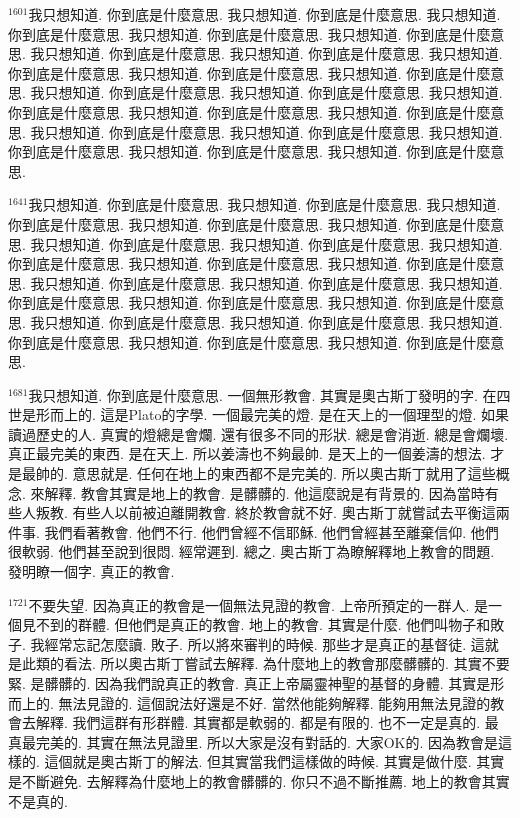 \documentclass{book}
\begin{document}
$^{1601}$我只想知道.
你到底是什麼意思.
我只想知道.
你到底是什麼意思.
我只想知道.
你到底是什麼意思.
我只想知道.
你到底是什麼意思.
我只想知道.
你到底是什麼意思.
我只想知道.
你到底是什麼意思.
我只想知道.
你到底是什麼意思.
我只想知道.
你到底是什麼意思.
我只想知道.
你到底是什麼意思.
我只想知道.
你到底是什麼意思.
我只想知道.
你到底是什麼意思.
我只想知道.
你到底是什麼意思.
我只想知道.
你到底是什麼意思.
我只想知道.
你到底是什麼意思.
我只想知道.
你到底是什麼意思.
我只想知道.
你到底是什麼意思.
我只想知道.
你到底是什麼意思.
我只想知道.
你到底是什麼意思.
我只想知道.
你到底是什麼意思.
我只想知道.
你到底是什麼意思.

$^{1641}$我只想知道.
你到底是什麼意思.
我只想知道.
你到底是什麼意思.
我只想知道.
你到底是什麼意思.
我只想知道.
你到底是什麼意思.
我只想知道.
你到底是什麼意思.
我只想知道.
你到底是什麼意思.
我只想知道.
你到底是什麼意思.
我只想知道.
你到底是什麼意思.
我只想知道.
你到底是什麼意思.
我只想知道.
你到底是什麼意思.
我只想知道.
你到底是什麼意思.
我只想知道.
你到底是什麼意思.
我只想知道.
你到底是什麼意思.
我只想知道.
你到底是什麼意思.
我只想知道.
你到底是什麼意思.
我只想知道.
你到底是什麼意思.
我只想知道.
你到底是什麼意思.
我只想知道.
你到底是什麼意思.
我只想知道.
你到底是什麼意思.
我只想知道.
你到底是什麼意思.

$^{1681}$我只想知道.
你到底是什麼意思.
一個無形教會.
其實是奧古斯丁發明的字.
在四世是形而上的.
這是Plato的字學.
一個最完美的燈.
是在天上的一個理型的燈.
如果讀過歷史的人.
真實的燈總是會爛.
還有很多不同的形狀.
總是會消逝.
總是會爛壞.
真正最完美的東西.
是在天上.
所以姜濤也不夠最帥.
是天上的一個姜濤的想法.
才是最帥的.
意思就是.
任何在地上的東西都不是完美的.
所以奧古斯丁就用了這些概念.
來解釋.
教會其實是地上的教會.
是髒髒的.
他這麼說是有背景的.
因為當時有些人叛教.
有些人以前被迫離開教會.
終於教會就不好.
奧古斯丁就嘗試去平衡這兩件事.
我們看著教會.
他們不行.
他們曾經不信耶穌.
他們曾經甚至離棄信仰.
他們很軟弱.
他們甚至說到很悶.
經常遲到.
總之.
奧古斯丁為瞭解釋地上教會的問題.
發明瞭一個字.
真正的教會.

$^{1721}$不要失望.
因為真正的教會是一個無法見證的教會.
上帝所預定的一群人.
是一個見不到的群體.
但他們是真正的教會.
地上的教會.
其實是什麼.
他們叫物子和敗子.
我經常忘記怎麼讀.
敗子.
所以將來審判的時候.
那些才是真正的基督徒.
這就是此類的看法.
所以奧古斯丁嘗試去解釋.
為什麼地上的教會那麼髒髒的.
其實不要緊.
是髒髒的.
因為我們說真正的教會.
真正上帝屬靈神聖的基督的身體.
其實是形而上的.
無法見證的.
這個說法好還是不好.
當然他能夠解釋.
能夠用無法見證的教會去解釋.
我們這群有形群體.
其實都是軟弱的.
都是有限的.
也不一定是真的.
最真最完美的.
其實在無法見證里.
所以大家是沒有對話的.
大家OK的.
因為教會是這樣的.
這個就是奧古斯丁的解法.
但其實當我們這樣做的時候.
其實是做什麼.
其實是不斷避免.
去解釋為什麼地上的教會髒髒的.
你只不過不斷推薦.
地上的教會其實不是真的.
\end{document}
